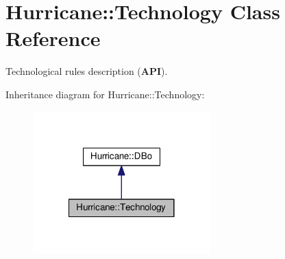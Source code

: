 \hypertarget{classHurricane_1_1Technology}{}\section{Hurricane\+:\+:Technology Class Reference}
\label{classHurricane_1_1Technology}


Technological rules description ({\bfseries A\+PI}).  




Inheritance diagram for Hurricane\+:\+:Technology\+:\nopagebreak
\begin{figure}[H]
\begin{center}
\leavevmode
\includegraphics[width=194pt]{classHurricane_1_1Technology__inherit__graph}
\end{center}
\end{figure}
